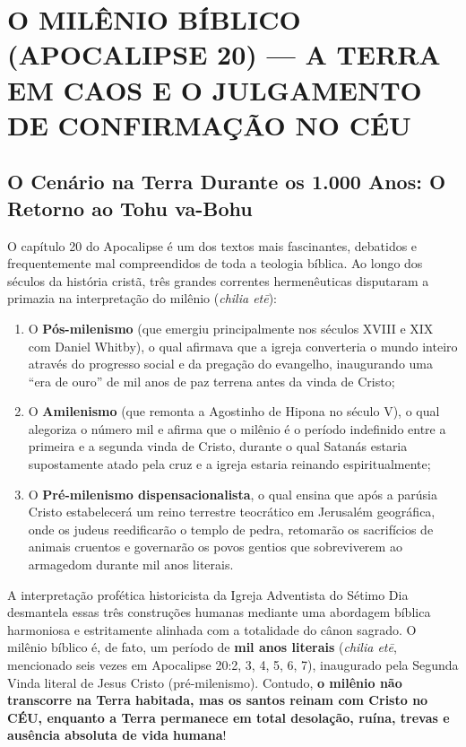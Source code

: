 \section{O MILÊNIO BÍBLICO (APOCALIPSE 20) — A TERRA EM CAOS E O JULGAMENTO DE CONFIRMAÇÃO NO CÉU}



\subsection{O Cenário na Terra Durante os 1.000 Anos: O Retorno ao Tohu va-Bohu}


O capítulo 20 do Apocalipse é um dos textos mais fascinantes, debatidos e frequentemente mal compreendidos de toda a teologia bíblica. Ao longo dos séculos da história cristã, três grandes correntes hermenêuticas disputaram a primazia na interpretação do milênio (\textit{chilia etē}):
\begin{enumerate}
  \item O \textbf{Pós-milenismo} (que emergiu principalmente nos séculos XVIII e XIX com Daniel Whitby), o qual afirmava que a igreja converteria o mundo inteiro através do progresso social e da pregação do evangelho, inaugurando uma ``era de ouro'' de mil anos de paz terrena antes da vinda de Cristo;
  \item O \textbf{Amilenismo} (que remonta a Agostinho de Hipona no século V), o qual alegoriza o número mil e afirma que o milênio é o período indefinido entre a primeira e a segunda vinda de Cristo, durante o qual Satanás estaria supostamente atado pela cruz e a igreja estaria reinando espiritualmente;
  \item O \textbf{Pré-milenismo dispensacionalista}, o qual ensina que após a parúsia Cristo estabelecerá um reino terrestre teocrático em Jerusalém geográfica, onde os judeus reedificarão o templo de pedra, retomarão os sacrifícios de animais cruentos e governarão os povos gentios que sobreviverem ao armagedom durante mil anos literais.
\end{enumerate}


A interpretação profética historicista da Igreja Adventista do Sétimo Dia desmantela essas três construções humanas mediante uma abordagem bíblica harmoniosa e estritamente alinhada com a totalidade do cânon sagrado. O milênio bíblico é, de fato, um período de \textbf{mil anos literais} (\textit{chilia etē}, mencionado seis vezes em Apocalipse 20:2, 3, 4, 5, 6, 7), inaugurado pela Segunda Vinda literal de Jesus Cristo (pré-milenismo). Contudo, \textbf{o milênio não transcorre na Terra habitada, mas os santos reinam com Cristo no CÉU, enquanto a Terra permanece em total desolação, ruína, trevas e ausência absoluta de vida humana}!

